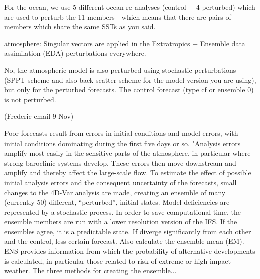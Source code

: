 For the ocean, we use 5 different ocean re-analyses (control + 4 perturbed) which are used to perturb the 11 members - which means that there are pairs of members which share the same SSTs as you said.

atmosphere: Singular vectors are applied in the Extratropics + Ensemble data assimilation (EDA) perturbations everywhere.

No, the atmospheric model is also perturbed using stochastic perturbations (SPPT scheme and also back-scatter scheme for the model version you are using), but only for the perturbed forecasts. The control forecast (type  cf or ensemble 0) is not perturbed. 

(Frederic email 9 Nov)

%


Poor forecasts result from errors in initial conditions and model errors, with initial conditions dominating during the first five days or so. "Analysis errors amplify most easily in the sensitive parts of the
atmosphere, in particular where strong baroclinic systems develop. These errors then move
downstream and amplify and thereby affect the large-scale flow. To estimate the effect of
possible initial analysis errors and the consequent uncertainty of the forecasts, small changes
to the 4D-Var analysis are made, creating an ensemble of many (currently 50) different,
“perturbed”, initial states. Model deficiencies are represented by a stochastic process. In order
to save computational time, the ensemble members are run with a lower resolution version of
the IFS. 
If the ensembles agree, it is a predictable state. If diverge significantly from each other and the control, less certain forecast. Also calculate the ensemble mean (EM). ENS provides information from which the probability of alternative
developments is calculated, in particular those related to risk of extreme or high-impact
weather. The three methods for creating the ensemble...

